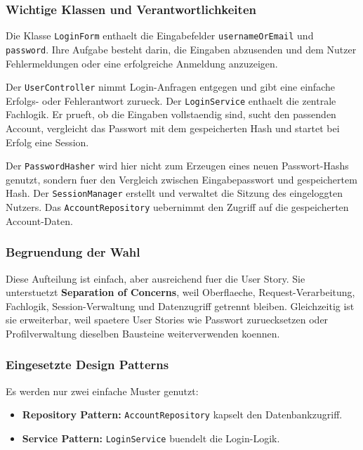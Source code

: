 \documentclass[a4paper,11pt]{article}
\begin{document}
\subsubsection*{Wichtige Klassen und Verantwortlichkeiten}

Die Klasse \texttt{LoginForm} enthaelt die Eingabefelder \texttt{usernameOrEmail} und \texttt{password}. Ihre Aufgabe besteht darin, die Eingaben abzusenden und dem Nutzer Fehlermeldungen oder eine erfolgreiche Anmeldung anzuzeigen.

Der \texttt{UserController} nimmt Login-Anfragen entgegen und gibt eine einfache Erfolgs- oder Fehlerantwort zurueck. Der \texttt{LoginService} enthaelt die zentrale Fachlogik. Er prueft, ob die Eingaben vollstaendig sind, sucht den passenden Account, vergleicht das Passwort mit dem gespeicherten Hash und startet bei Erfolg eine Session.

Der \texttt{PasswordHasher} wird hier nicht zum Erzeugen eines neuen Passwort-Hashs genutzt, sondern fuer den Vergleich zwischen Eingabepasswort und gespeichertem Hash. Der \texttt{SessionManager} erstellt und verwaltet die Sitzung des eingeloggten Nutzers. Das \texttt{AccountRepository} uebernimmt den Zugriff auf die gespeicherten Account-Daten.

\subsubsection*{Begruendung der Wahl}

Diese Aufteilung ist einfach, aber ausreichend fuer die User Story. Sie unterstuetzt \textbf{Separation of Concerns}, weil Oberflaeche, Request-Verarbeitung, Fachlogik, Session-Verwaltung und Datenzugriff getrennt bleiben. Gleichzeitig ist sie erweiterbar, weil spaetere User Stories wie Passwort zuruecksetzen oder Profilverwaltung dieselben Bausteine weiterverwenden koennen.

\subsubsection*{Eingesetzte Design Patterns}

Es werden nur zwei einfache Muster genutzt:
\begin{itemize}
	\item \textbf{Repository Pattern:} \texttt{AccountRepository} kapselt den Datenbankzugriff.
	\item \textbf{Service Pattern:} \texttt{LoginService} buendelt die Login-Logik.
\end{itemize}
\end{document}
